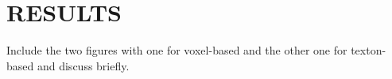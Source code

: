 \section{RESULTS}\label{sec:results}

Include the two figures with one for voxel-based and the other one for texton-based and discuss briefly.



